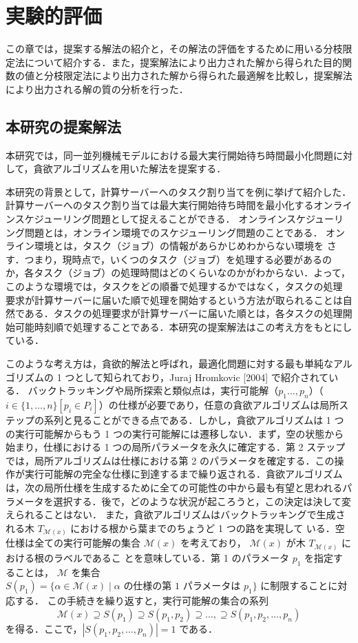 \documentclass[12pt]{optlab-bachelor}
\begin{document}
\chapter{実験的評価}\label{c_5}
この章では，提案する解法の紹介と，その解法の評価をするために用いる分枝限定法について紹介する．また，提案解法により出力された解から得られた目的関数の値と分枝限定法により出力された解から得られた最適解を比較し，提案解法により出力される解の質の分析を行った．

\section{本研究の提案解法}
本研究では，同一並列機械モデルにおける最大実行開始待ち時間最小化問題に対して，貪欲アルゴリズムを用いた解法を提案する．

本研究の背景として，計算サーバーへのタスク割り当てを例に挙げて紹介した．
計算サーバーへのタスク割り当ては最大実行開始待ち時間を最小化するオンラインスケジューリング問題として捉えることができる．
オンラインスケジューリング問題とは，オンライン環境でのスケジューリング問題のことである．
オンライン環境とは，タスク（ジョブ）の情報があらかじめわからない環境を
さす．つまり，現時点で，いくつのタスク（ジョブ）を処理する必要があるの
か，各タスク（ジョブ）の処理時間はどのくらいなのかがわからない．よって，
このような環境では，タスクをどの順番で処理するかではなく，タスクの処理
要求が計算サーバーに届いた順で処理を開始するという方法が取られることは自然である．タスクの処理要求が計算サーバーに届いた順とは，各タスクの処理開始可能時刻順で処理することである．本研究の提案解法はこの考え方をもとにしている．

このような考え方は，貪欲的解法と呼ばれ，最適化問題に対する最も単純なアルゴリズムの 1 つとして知られており，Juraj Hromkovic [2004] \cite{greedy} で紹介されている．
バックトラッキングや局所探索と類似点は，実行可能解（$p_1\ldots,p_n$）（$i \in \{1,\ldots,n\}[p_i \in P_i]$）の仕様が必要であり，任意の貪欲アルゴリズムは局所ステップの系列と見ることができる点である．しかし，貪欲アルゴリズムは 1 つの実行可能解からもう 1 つの実行可能解には遷移しない．まず，空の状態から始まり，仕様における 1 つの局所パラメータを永久に確定する．第 2 ステップでは，局所アルゴリズムは仕様における第 2 のパラメータを確定する．この操作が実行可能解の完全な仕様に到達するまで繰り返される．貪欲アルゴリズムは，次の局所仕様を生成するために全ての可能性の中から最も有望と思われるパラメータを選択する．後で，どのような状況が起ころうと，この決定は決して変えられることはない．
また，貪欲アルゴリズムはバックトラッキングで生成される木
$T_{\mathcal{M}(x)}$ における根から葉までのちょうど 1 つの路を実現して
いる．空仕様は全ての実行可能解の集合 $\mathcal{M}(x)$ を考えており，
$\mathcal{M}(x)$ が木 $T_{\mathcal{M}(x)}$ における根のラベルであるこ
とを意味している．第 1 のパラメータ $p_1$ を指定することは，
$\mathcal{M}$ を集合 $S(p_1) = \{\alpha \in \mathcal{M}(x) \mid \alpha
\text{ の仕様の第 1 パラメータは } p_1\}$ に制限することに対応する．
この手続きを繰り返すと，実行可能解の集合の系列
$$\mathcal{M}(x) \supseteq S(p_1) \supseteq S(p_1,p_2) \supseteq
\ldots, \supseteq S(p_1,p_2,\ldots,p_n)$$
を得る．ここで，$|S(p_1,p_2,\ldots,p_n)| = 1$ である．
\end{document}

